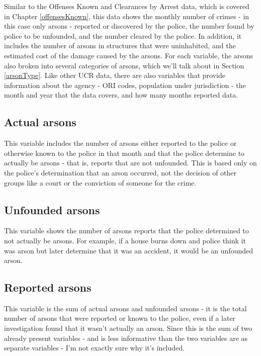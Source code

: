 \documentclass[
  12pt,
  openany]{book}
\begin{document}
Similar to the Offenses Known and Clearances by Arrest data, which is covered in Chapter \ref{offensesKnown}, this data shows the monthly number of crimes - in this case only arsons - reported or discovered by the police, the number found by police to be unfounded, and the number cleared by the police. In addition, it includes the number of arsons in structures that were uninhabited, and the estimated cost of the damage caused by the arsons. For each variable, the arsons also broken into several categories of arsons, which we'll talk about in Section \ref{arsonType}. Like other UCR data, there are also variables that provide information about the agency - ORI codes, population under jurisdiction - the month and year that the data covers, and how many months reported data.

\hypertarget{actual-arsons}{%
\subsection{Actual arsons}\label{actual-arsons}}

This variable includes the number of arsons either reported to the police or otherwise known to the police in that month and that the police determine to actually be arsons - that is, reports that are not unfounded. This is based only on the police's determination that an arson occurred, not the decision of other groups like a court or the conviction of someone for the crime.

\hypertarget{unfounded-arsons}{%
\subsection{Unfounded arsons}\label{unfounded-arsons}}

This variable shows the number of arsons reports that the police determined to not actually be arsons. For example, if a house burns down and police think it was arson but later determine that it was an accident, it would be an unfounded arson.

\hypertarget{reported-arsons}{%
\subsection{Reported arsons}\label{reported-arsons}}

This variable is the sum of actual arsons and unfounded arsons - it is the total number of arsons that were reported or known to the police, even if a later investigation found that it wasn't actually an arson. Since this is the sum of two already present variables - and is less informative than the two variables are as separate variables - I'm not exactly sure why it's included.
\end{document}
